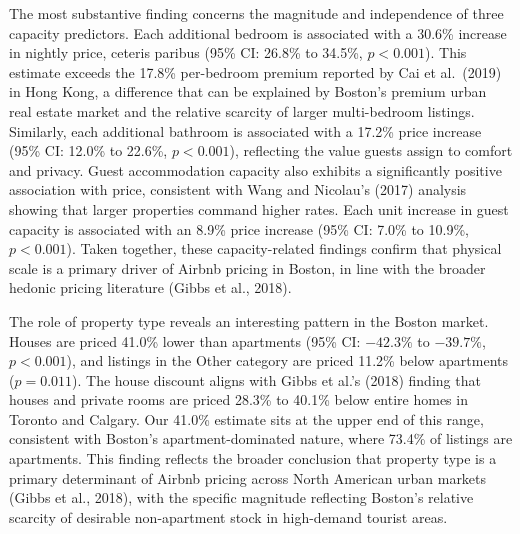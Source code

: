\documentclass[
]{article}
\begin{document}
The most substantive finding concerns the magnitude and independence of
three capacity predictors. Each additional bedroom is associated with a
30.6\% increase in nightly price, ceteris paribus (95\% CI: 26.8\% to
34.5\%, \(p < 0.001\)). This estimate exceeds the 17.8\% per-bedroom
premium reported by Cai et al.~(2019) in Hong Kong, a difference that
can be explained by Boston's premium urban real estate market and the
relative scarcity of larger multi-bedroom listings. Similarly, each
additional bathroom is associated with a 17.2\% price increase (95\% CI:
12.0\% to 22.6\%, \(p < 0.001\)), reflecting the value guests assign to
comfort and privacy. Guest accommodation capacity also exhibits a
significantly positive association with price, consistent with Wang and
Nicolau's (2017) analysis showing that larger properties command higher
rates. Each unit increase in guest capacity is associated with an 8.9\%
price increase (95\% CI: 7.0\% to 10.9\%, \(p < 0.001\)). Taken
together, these capacity-related findings confirm that physical scale is
a primary driver of Airbnb pricing in Boston, in line with the broader
hedonic pricing literature (Gibbs et al., 2018).

The role of property type reveals an interesting pattern in the Boston
market. Houses are priced 41.0\% lower than apartments (95\% CI:
\(-42.3\%\) to \(-39.7\%\), \(p < 0.001\)), and listings in the Other
category are priced 11.2\% below apartments (\(p = 0.011\)). The house
discount aligns with Gibbs et al.'s (2018) finding that houses and
private rooms are priced 28.3\% to 40.1\% below entire homes in Toronto
and Calgary. Our 41.0\% estimate sits at the upper end of this range,
consistent with Boston's apartment-dominated nature, where 73.4\% of
listings are apartments. This finding reflects the broader conclusion
that property type is a primary determinant of Airbnb pricing across
North American urban markets (Gibbs et al., 2018), with the specific
magnitude reflecting Boston's relative scarcity of desirable
non-apartment stock in high-demand tourist areas.
\end{document}
